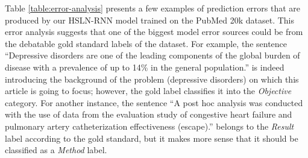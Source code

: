 \documentclass[11pt,a4paper]{article}
\begin{document}
Table \ref{table:error-analysis} presents a few examples of prediction errors that are produced by our HSLN-RNN model trained on the PubMed 20k dataset. This error analysis suggests that one of the biggest model error sources could be from the debatable gold standard labels of the dataset. For example, the sentence ``Depressive disorders are one of the leading components of the global burden of disease with a prevalence of up to 14\% in the general population.'' is indeed introducing the background of the problem (depressive disorders) on which this article is going to focus; however, the gold label classifies it into the \textit{Objective} category. For another instance, the sentence ``A post hoc analysis was conducted with the use of data from the evaluation study of congestive heart failure and pulmonary artery catheterization effectiveness (escape).'' belongs to the \textit{Result} label according to the gold standard, but it makes more sense that it should be classified as a \textit{Method} label.
\end{document}
